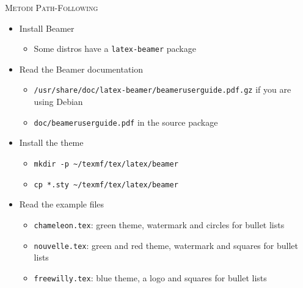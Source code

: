 
\begin{frame}[t]{\textsc{\LARGE Metodi Path-Following}}
\begin{itemize}
\item Install Beamer
  \begin{itemize}
  \item Some distros have a \verb!latex-beamer! package
  \end{itemize}
\item Read the Beamer documentation
  \begin{itemize}
  \item \verb!/usr/share/doc/latex-beamer/beameruserguide.pdf.gz! if you are
        using Debian
  \item \verb!doc/beameruserguide.pdf! in the source package
  \end{itemize}
\item Install the theme
  \begin{itemize}
  \item \verb!mkdir -p ~/texmf/tex/latex/beamer!\\
  \item \verb!cp *.sty ~/texmf/tex/latex/beamer!
  \end{itemize}
\item Read the example files
  \begin{itemize}
  \item \verb!chameleon.tex!: green theme, watermark and circles for bullet
        lists
  \item \verb!nouvelle.tex!: green and red theme, watermark and squares for
        bullet lists
  \item \verb!freewilly.tex!: blue theme, a logo and squares for bullet lists
  \end{itemize}
\end{itemize}
\end{frame}

